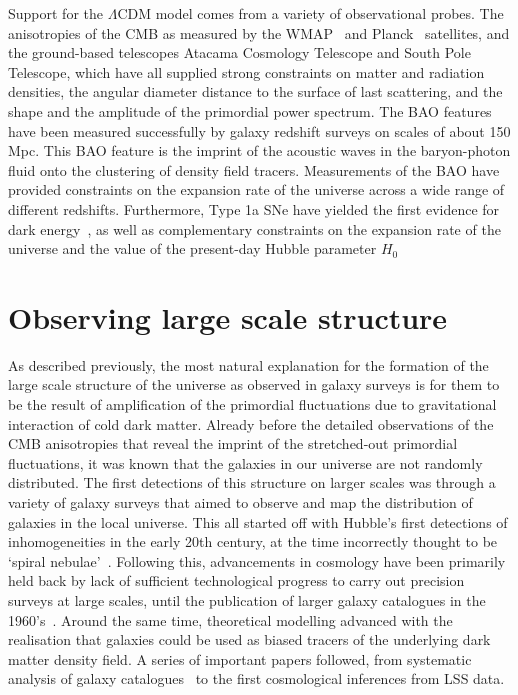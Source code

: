 Support for the $\Lambda$CDM model comes from a variety of observational probes. The anisotropies of the CMB as measured by the WMAP~\cite{Bennett:2013} and Planck~\cite{Aghanim:2018eyx} satellites, and the ground-based telescopes Atacama Cosmology Telescope and South Pole Telescope, which have all supplied strong constraints on matter and radiation densities, the angular diameter distance to the surface of last scattering, and the shape and the amplitude of the primordial power spectrum. The BAO features have been measured successfully by galaxy redshift surveys on scales of about 150 Mpc. This BAO feature is the imprint of the acoustic waves in the baryon-photon fluid onto the clustering of density field tracers. Measurements of the BAO have provided constraints on the expansion rate of the universe across a wide range of different redshifts.  Furthermore, Type 1a SNe have yielded the first evidence for dark energy~\cite{SupernovaSearchTeam:1998fmf,SupernovaCosmologyProject:1998vns}, as well as complementary constraints on the expansion rate of the universe and the value of the present-day Hubble parameter $H_0$

\section{Observing large scale structure}

As described previously, the most natural explanation for the formation of the large scale structure of the universe as observed in galaxy surveys is for them to be the result of amplification of the primordial fluctuations due to gravitational interaction of cold dark matter. Already before the detailed observations of the CMB anisotropies that reveal the imprint of the stretched-out primordial fluctuations, it was known that the galaxies in our universe are not randomly distributed. The first detections of this structure on larger scales was through a variety of galaxy surveys that aimed to observe and map the distribution of galaxies in the local universe. This all started off with Hubble's first detections of inhomogeneities in the early 20th century, at the time incorrectly thought to be `spiral nebulae'~\cite{Hubble:1926,Hubble:1934}. Following this, advancements in cosmology have been primarily held back by lack of sufficient technological progress to carry out precision surveys at large scales, until the publication of larger galaxy catalogues in the 1960's~\cite{Shane:1967,Zwicky:1961}. Around the same time, theoretical modelling advanced with the realisation that galaxies could be used as biased tracers of the underlying dark matter density field. A series of important papers followed, from systematic analysis of galaxy catalogues~\cite{Peebles:1973} to the first cosmological inferences from LSS data. 


